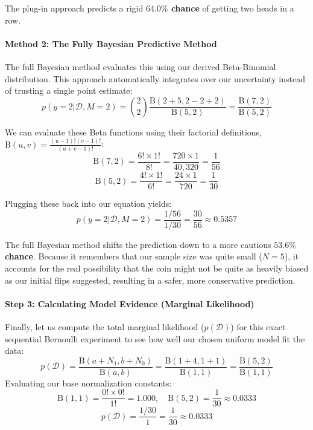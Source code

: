 \documentclass{article}
\begin{document}
The plug-in approach predicts a rigid \textbf{$64.0\%$ chance} of getting two heads in a row.

\paragraph{Method 2: The Fully Bayesian Predictive Method}
The full Bayesian method evaluates this using our derived Beta-Binomial distribution. This approach automatically integrates over our uncertainty instead of trusting a single point estimate:
\begin{equation}
p(y=2|\mathcal{D}, M=2) = \binom{2}{2}\frac{\text{B}(2+5, 2-2+2)}{\text{B}(5, 2)} = \frac{\text{B}(7, 2)}{\text{B}(5, 2)}
\end{equation}

We can evaluate these Beta functions using their factorial definitions, $\text{B}(u, v) = \frac{(u-1)!(v-1)!}{(u+v-1)!}$:
\begin{equation}
\text{B}(7, 2) = \frac{6! \times 1!}{8!} = \frac{720 \times 1}{40,320} = \frac{1}{56}
\end{equation}
\begin{equation}
\text{B}(5, 2) = \frac{4! \times 1!}{6!} = \frac{24 \times 1}{720} = \frac{1}{30}
\end{equation}

Plugging these back into our equation yields:
\begin{equation}
p(y=2|\mathcal{D}, M=2) = \frac{1/56}{1/30} = \frac{30}{56} \approx 0.5357
\end{equation}

The full Bayesian method shifts the prediction down to a more cautious \textbf{$53.6\%$ chance}. Because it remembers that our sample size was quite small ($N=5$), it accounts for the real possibility that the coin might not be quite as heavily biased as our initial flips suggested, resulting in a safer, more conservative prediction.

\paragraph{Step 3: Calculating Model Evidence (Marginal Likelihood)}
Finally, let us compute the total marginal likelihood ($p(\mathcal{D})$) for this exact sequential Bernoulli experiment to see how well our chosen uniform model fit the data:
\begin{equation}
p(\mathcal{D}) = \frac{\text{B}(a + N_1, b + N_0)}{\text{B}(a, b)} = \frac{\text{B}(1+4, 1+1)}{\text{B}(1, 1)} = \frac{\text{B}(5, 2)}{\text{B}(1, 1)}
\end{equation}
Evaluating our base normalization constants:
\begin{equation}
\text{B}(1, 1) = \frac{0! \times 0!}{1!} = 1.000, \quad \text{B}(5, 2) = \frac{1}{30} \approx 0.0333
\end{equation}
\begin{equation}
p(\mathcal{D}) = \frac{1/30}{1} = \frac{1}{30} \approx 0.0333
\end{equation}
\end{document}
